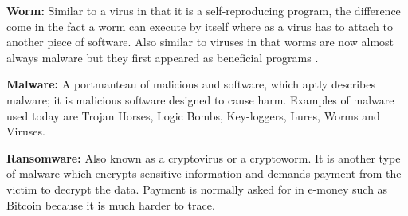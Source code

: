 \textbf{Worm:} Similar to a virus in that it is a self-reproducing program, the difference come in the fact a worm can execute by itself where as a virus has to attach to another piece of software. Also similar to viruses in that worms are now almost always malware but they first appeared as beneficial programs \cite{RN93}.

\textbf{Malware:} A portmanteau of malicious and software, which aptly describes malware; it is malicious software designed to cause harm. Examples of malware used today are Trojan Horses, Logic Bombs, Key-loggers, Lures, Worms and Viruses.

\textbf{Ransomware:} Also known as a cryptovirus or a cryptoworm. It is another type of malware which encrypts sensitive information and demands payment from the victim to decrypt the data. Payment is normally asked for in e-money such as Bitcoin because it is much harder to trace.
\\

